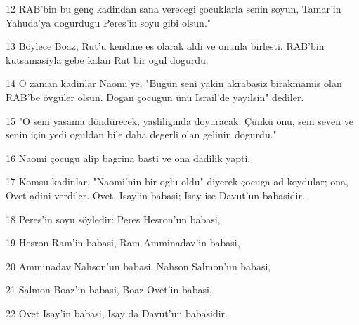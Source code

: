 \par 12 RAB'bin bu genç kadindan sana verecegi çocuklarla senin soyun, Tamar'in Yahuda'ya dogurdugu Peres'in soyu gibi olsun."
\par 13 Böylece Boaz, Rut'u kendine es olarak aldi ve onunla birlesti. RAB'bin kutsamasiyla gebe kalan Rut bir ogul dogurdu.
\par 14 O zaman kadinlar Naomi'ye, "Bugün seni yakin akrabasiz birakmamis olan RAB'be övgüler olsun. Dogan çocugun ünü Israil'de yayilsin" dediler.
\par 15 "O seni yasama döndürecek, yasliliginda doyuracak. Çünkü onu, seni seven ve senin için yedi oguldan bile daha degerli olan gelinin dogurdu."
\par 16 Naomi çocugu alip bagrina basti ve ona dadilik yapti.
\par 17 Komsu kadinlar, "Naomi'nin bir oglu oldu" diyerek çocuga ad koydular; ona, Ovet adini verdiler. Ovet, Isay'in babasi; Isay ise Davut'un babasidir.
\par 18 Peres'in soyu söyledir: Peres Hesron'un babasi,
\par 19 Hesron Ram'in babasi, Ram Amminadav'in babasi,
\par 20 Amminadav Nahson'un babasi, Nahson Salmon'un babasi,
\par 21 Salmon Boaz'in babasi, Boaz Ovet'in babasi,
\par 22 Ovet Isay'in babasi, Isay da Davut'un babasidir.


